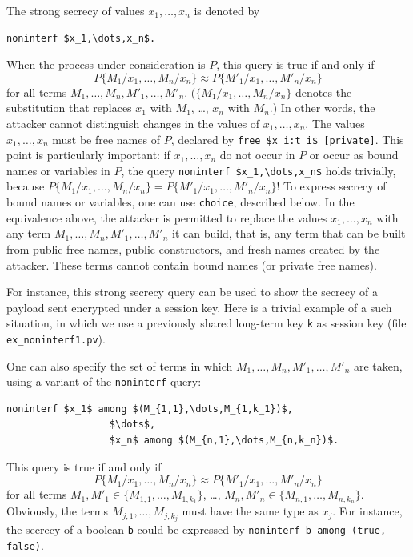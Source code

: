 \documentclass{book}
\newcommand{\tblue}[1]{\textcolor{blue}{REMARK: \emph{#1}}}
\renewcommand{\marginpar}[1]{\tblue{#1}}
\begin{document}
%
The strong secrecy of values $x_1,\dots,x_n$ is denoted by
\begin{lstlisting}[numbers=none]
	noninterf $x_1,\dots,x_n$.
\end{lstlisting}
When the process under consideration is $P$, this query is true if and
only if
\[P\{M_1/x_1, \ldots, M_n/x_n\} \approx P\{M'_1/x_1, \ldots, M'_n/x_n\}\]
for all terms $M_1, \ldots, M_n, M'_1, \ldots, M'_n$. ($\{M_1/x_1, \ldots, M_n/x_n\}$ denotes the substitution that replaces $x_1$ with $M_1$, \ldots, $x_n$ with $M_n$.) In other words, the
attacker cannot distinguish changes in the values of $x_1, \ldots,
x_n$. The values $x_1, \ldots, x_n$ must be free names of $P$,
declared by \lstinline!free $x_i:t_i$ [private]!. This point
is particularly important: if $x_1, \ldots,
x_n$ do not occur in $P$ or occur as bound names or variables in $P$,
the query \lstinline!noninterf $x_1,\dots,x_n$! holds trivially,
because $P\{M_1/x_1, \ldots, M_n/x_n\} = P\{M'_1/x_1, \ldots,
M'_n/x_n\}$! To express secrecy of bound names or variables, one can
use \lstinline!choice!, described below.
In the equivalence above, the attacker is permitted to
replace the values $x_1,\dots,x_n$ with any term $M_1, \ldots, M_n,
M'_1, \ldots, M'_n$ it can build, that is, any term that can be
built from public free names, public constructors, and fresh names
created by the attacker. These terms cannot contain bound names (or
private free names).

For instance, this strong secrecy query can be used to show the secrecy of a payload sent encrypted under a session key. Here is a trivial example of a such situation, in which we use a previously shared long-term key \lstinline!k! as session key (file \texttt{{\docexdir}ex\_noninterf1.pv}).
%


One can also specify the set of terms in which $M_1, \ldots, M_n, M'_1, \ldots, M'_n$ are taken, using a variant of the \lstinline!noninterf! query:
\begin{lstlisting}[numbers=none]
	noninterf $x_1$ among $(M_{1,1},\dots,M_{1,k_1})$,
			      $\dots$,
			      $x_n$ among $(M_{n,1},\dots,M_{n,k_n})$.
\end{lstlisting}
This query is true if and only if
\[P\{M_1/x_1, \ldots, M_n/x_n\} \approx P\{M'_1/x_1, \ldots, M'_n/x_n\}\]
for all terms $M_1, M'_1 \in \{ M_{1,1},\dots,M_{1,k_1} \}$, \ldots,
$M_n, M'_n \in \{ M_{n,1},\dots,M_{n,k_n} \}$.
Obviously, the terms $M_{j,1},\dots,M_{j,k_j}$ must have the same type as $x_j$.
For instance, the secrecy of a boolean \lstinline!b! could be expressed by
\lstinline!noninterf b among (true, false)!.
\end{document}

